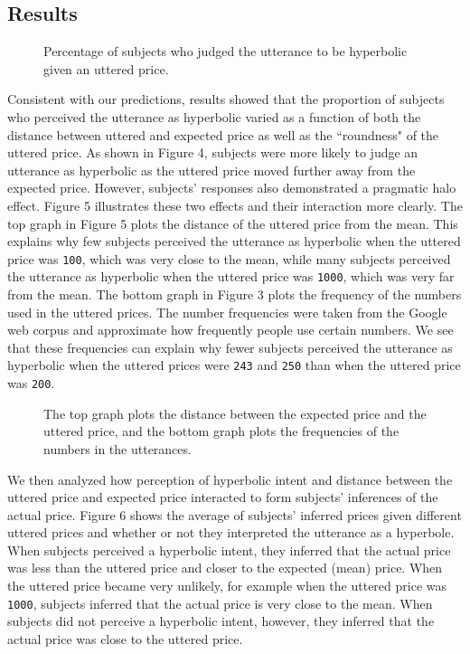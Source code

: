 \documentclass{article} %
\begin{document}
\subsection{Results}

\begin{figure}[t]
\caption{Percentage of subjects who judged the utterance to be hyperbolic given an uttered price.}
\end{figure}

Consistent with our predictions, results showed that the proportion of subjects who perceived the utterance as hyperbolic varied as a function of both the distance between uttered and expected price as well as the ``roundness" of the uttered price. As shown in Figure 4, subjects were more likely to judge an utterance as hyperbolic as the uttered price moved further away from the expected price. However, subjects' responses also demonstrated a pragmatic halo effect. Figure 5 illustrates these two effects and their interaction more clearly. The top graph in Figure 5 plots the distance of the uttered price from the mean. This explains why few subjects perceived the utterance as hyperbolic when the uttered price was \texttt{100}, which was very close to the mean, while many subjects perceived the utterance as hyperbolic when the uttered price was \texttt{1000}, which was very far from the mean. The bottom graph in Figure 3 plots the frequency of the numbers used in the uttered prices. The number frequencies were taken from the Google web corpus and approximate how frequently people use certain numbers. We see that these frequencies can explain why fewer subjects perceived the utterance as hyperbolic when the uttered prices were \texttt{243} and \texttt{250} than when the uttered price was \texttt{200}.

\begin{figure}[t]
\caption{The top graph plots the distance between the expected price and the uttered price, and the bottom graph plots the frequencies of the numbers in the utterances.}
\end{figure}


We then analyzed how perception of hyperbolic intent and distance between the uttered price and expected price interacted to form subjects' inferences of the actual price. Figure 6 shows the average of subjects' inferred prices given different uttered prices and whether or not they interpreted the utterance as a hyperbole. When subjects perceived a hyperbolic intent, they inferred that the actual price was less than the uttered price and closer to the expected (mean) price. When the uttered price became very unlikely, for example when the uttered price was \texttt{1000}, subjects inferred that the actual price is very close to the mean. When subjects did not perceive a hyperbolic intent, however, they inferred that the actual price was close to the uttered price. 
\end{document}
